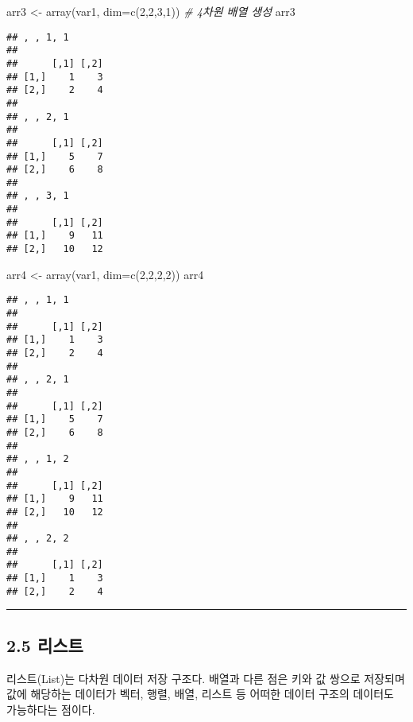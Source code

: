 \documentclass[
]{article}
\newenvironment{Shaded}{\begin{snugshade}}{\end{snugshade}}
\newcommand{\AttributeTok}[1]{\textcolor[rgb]{0.77,0.63,0.00}{#1}}
\newcommand{\CommentTok}[1]{\textcolor[rgb]{0.56,0.35,0.01}{\textit{#1}}}
\newcommand{\DecValTok}[1]{\textcolor[rgb]{0.00,0.00,0.81}{#1}}
\newcommand{\FunctionTok}[1]{\textcolor[rgb]{0.00,0.00,0.00}{#1}}
\newcommand{\NormalTok}[1]{#1}
\newcommand{\OtherTok}[1]{\textcolor[rgb]{0.56,0.35,0.01}{#1}}
\begin{document}
\begin{Shaded}
\begin{Highlighting}[]
\NormalTok{arr3 }\OtherTok{\textless{}{-}} \FunctionTok{array}\NormalTok{(var1, }\AttributeTok{dim=}\FunctionTok{c}\NormalTok{(}\DecValTok{2}\NormalTok{,}\DecValTok{2}\NormalTok{,}\DecValTok{3}\NormalTok{,}\DecValTok{1}\NormalTok{))  }\CommentTok{\# 4차원 배열 생성}
\NormalTok{arr3}
\end{Highlighting}
\end{Shaded}

\begin{verbatim}
## , , 1, 1
## 
##      [,1] [,2]
## [1,]    1    3
## [2,]    2    4
## 
## , , 2, 1
## 
##      [,1] [,2]
## [1,]    5    7
## [2,]    6    8
## 
## , , 3, 1
## 
##      [,1] [,2]
## [1,]    9   11
## [2,]   10   12
\end{verbatim}

\begin{Shaded}
\begin{Highlighting}[]
\NormalTok{arr4 }\OtherTok{\textless{}{-}} \FunctionTok{array}\NormalTok{(var1, }\AttributeTok{dim=}\FunctionTok{c}\NormalTok{(}\DecValTok{2}\NormalTok{,}\DecValTok{2}\NormalTok{,}\DecValTok{2}\NormalTok{,}\DecValTok{2}\NormalTok{))}
\NormalTok{arr4}
\end{Highlighting}
\end{Shaded}

\begin{verbatim}
## , , 1, 1
## 
##      [,1] [,2]
## [1,]    1    3
## [2,]    2    4
## 
## , , 2, 1
## 
##      [,1] [,2]
## [1,]    5    7
## [2,]    6    8
## 
## , , 1, 2
## 
##      [,1] [,2]
## [1,]    9   11
## [2,]   10   12
## 
## , , 2, 2
## 
##      [,1] [,2]
## [1,]    1    3
## [2,]    2    4
\end{verbatim}

\begin{center}\rule{0.5\linewidth}{0.5pt}\end{center}

\hypertarget{uxb9acuxc2a4uxd2b8}{%
\subsection{2.5 리스트}\label{uxb9acuxc2a4uxd2b8}}

리스트(List)는 다차원 데이터 저장 구조다. 배열과 다른 점은 키와 값
쌍으로 저장되며 값에 해당하는 데이터가 벡터, 행렬, 배열, 리스트 등
어떠한 데이터 구조의 데이터도 가능하다는 점이다.
\end{document}
